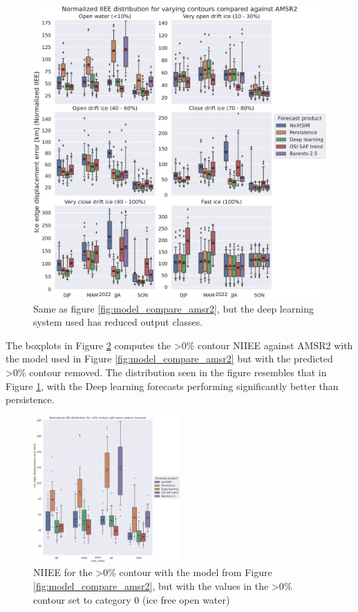 \documentclass[../main/thesis.tex]{subfiles}
\begin{document}
\begin{figure}
    \centering
    \includegraphics[width=\textwidth]{model_intercomparisson_amsr2_reduced.pdf}
    \caption{\label{fig:model_compare_amsr2_reduced}Same as figure \ref{fig:model_compare_amsr2}, but the deep learning system used has reduced output classes.}
\end{figure}

The boxplots in Figure \ref{fig:removed_1contour_amsr2} computes the >0\% contour NIIEE against AMSR2 with the model used in Figure \ref{fig:model_compare_amsr2} but with the predicted >0\% contour removed. The distribution seen in the figure resembles that in Figure \ref{fig:model_compare_amsr2_reduced}, with the Deep learning forecasts performing significantly better than persistence. 

\begin{figure}
    \centering
    \includegraphics[width=0.5\textwidth]{removed_1contour_amsr2.pdf}
    \caption{\label{fig:removed_1contour_amsr2}NIIEE for the >0\% contour with the model from Figure \ref{fig:model_compare_amsr2}, but with the values in the >0\% contour set to category 0 (ice free open water)}
\end{figure}


\biblio
\end{document}
